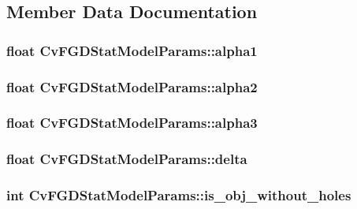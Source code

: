 \subsection{Member Data Documentation}
\hypertarget{structCvFGDStatModelParams_ab1070d30fd82b26ec8766721122e8483}{
\subsubsection[{alpha1}]{\setlength{\rightskip}{0pt plus 5cm}float Cv\-F\-G\-D\-Stat\-Model\-Params\-::alpha1}}\label{structCvFGDStatModelParams_ab1070d30fd82b26ec8766721122e8483}
\hypertarget{structCvFGDStatModelParams_ace1a97cf24f397d30a522b66c9a9ec79}{
\subsubsection[{alpha2}]{\setlength{\rightskip}{0pt plus 5cm}float Cv\-F\-G\-D\-Stat\-Model\-Params\-::alpha2}}\label{structCvFGDStatModelParams_ace1a97cf24f397d30a522b66c9a9ec79}
\hypertarget{structCvFGDStatModelParams_a975b153605ac09b3b04e263452169493}{
\subsubsection[{alpha3}]{\setlength{\rightskip}{0pt plus 5cm}float Cv\-F\-G\-D\-Stat\-Model\-Params\-::alpha3}}\label{structCvFGDStatModelParams_a975b153605ac09b3b04e263452169493}
\hypertarget{structCvFGDStatModelParams_ac4fa054edef4b46290e1d81b95bffc39}{
\subsubsection[{delta}]{\setlength{\rightskip}{0pt plus 5cm}float Cv\-F\-G\-D\-Stat\-Model\-Params\-::delta}}\label{structCvFGDStatModelParams_ac4fa054edef4b46290e1d81b95bffc39}
\hypertarget{structCvFGDStatModelParams_a5e06949f2ff0adf20bd5bb9059c0a179}{
\subsubsection[{is\-\_\-obj\-\_\-without\-\_\-holes}]{\setlength{\rightskip}{0pt plus 5cm}int Cv\-F\-G\-D\-Stat\-Model\-Params\-::is\-\_\-obj\-\_\-without\-\_\-holes}}\label{structCvFGDStatModelParams_a5e06949f2ff0adf20bd5bb9059c0a179}
